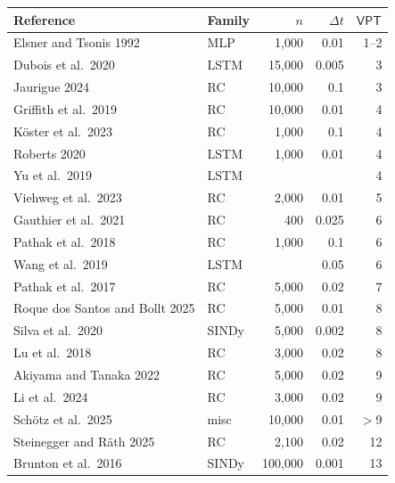 \documentclass{article}
\newcommand{\stepsize}{\Delta\!t}
\newcommand{\vpt}[1]{\mathsf{VPT}_{#1}}
\begin{document}
\begin{table}
	\centering
	\renewcommand{\arraystretch}{0.73}
	\setlength{\tabcolsep}{0.3em}
	\begin{tabular}{llrrr}
		\toprule
		\textbf{Reference} & \textbf{Family} & \textbf{$n$} & \textbf{$\stepsize$} & \textbf{$\vpt{}$} \\
		\midrule
		Elsner and Tsonis 1992 \citep{Elsner1992} & MLP & 1{,}000 & 0.01 & 1--2 \\
		Dubois et al.\ 2020 \citep{Dubois2020} & LSTM & 15{,}000 & 0.005 & 3 \\
		Jaurigue 2024 \citep{Jaurigue2024} & RC & 10{,}000 & 0.1 & 3 \\
		Griffith et al.\ 2019 \citep{Griffith2019} & RC & 10{,}000 & 0.01 & 4 \\
		K\"oster et al.\ 2023 \citep{Koster2023} & RC & 1{,}000 & 0.1 & 4 \\
		Roberts 2020 \citep{Roberts2020} & LSTM & 1{,}000 & 0.01 & 4 \\
		Yu et al.\ 2019 \citep{Yu2019} & LSTM & & & 4 \\
		Viehweg et al.\ 2023 \citep{Viehweg2023} & RC & 2{,}000 & 0.01 & 5 \\
		Gauthier et al.\ 2021 \citep{Gauthier2021} & RC & 400 & 0.025 & 6 \\
		Pathak et al.\ 2018 \citep{Pathak2018} & RC & 1{,}000 & 0.1 & 6 \\
		Wang et al.\ 2019 \citep{Wang2019} & LSTM & & 0.05 & 6 \\
		Pathak et al.\ 2017 \citep{Pathak2017} & RC & 5{,}000 & 0.02 & 7 \\
		Roque dos Santos and Bollt 2025 \citep{Santos2025} & RC & 5{,}000 & 0.01 & 8 \\
        Silva et al.\ 2020 \citep{deSilva2020} & SINDy & 5{,}000 & 0.002 & 8 \\
        Lu et al.\ 2018 \citep{Lu2018} & RC & 3{,}000 & 0.02 & 8 \\
		Akiyama and Tanaka 2022 \citep{Akiyama2022} & RC & 5{,}000 & 0.02 & 9 \\
		Li et al.\ 2024  \citep{Li2024} & RC & 3{,}000 & 0.02 & 9 \\
		Sch\"otz et al.\ 2025 \citep{Schotz2025} & misc & 10{,}000 & 0.01 & $>$9 \\
		Steinegger and R\"ath 2025  \citep{Steinegger2025} & RC & 2{,}100 & 0.02 & 12 \\
		Brunton et al.\ 2016  \citep{Brunton2015} & SINDy & 100{,}000 & 0.001 & 13 \\

\end{tabular}
\end{table}
\end{document}
